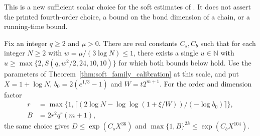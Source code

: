 This is a new sufficient scalar choice for the soft estimates of
\cite[lines 1262--1268 and 1373--1420]{Arad2016RigorousRG}.
It does not assert the printed fourth-order choice, a bound on the bond dimension of a chain, or a running-time bound.

\begin{theorem}
    \label{thm:soft_scalar_growth}
    \leanok
    Fix an integer $q\ge2$ and $\mu>0$. There are real constants $C_s,C_b$
    such that for each integer $N\ge2$ with $w=\mu/(3\log N)\le1$,
    there exists a single $u\in\mathbb N$ with
    $u\ge\max\{2,S(q,w^2/2,24,10,10)\}$ for which both bounds below hold.
    Use the parameters of Theorem~\ref{thm:soft_family_calibration} at this
    scale, and put $X=1+\log N$, $b_0=2(e^{1/3}-1)$ and $W=t2^{m+1}$.
    For the order and dimension factor
    \begin{align}
        r &= \max\{1,\lceil(2\log N-\log\log(1+\xi/W))/(-\log b_0)\rceil\},
        \label{eq:soft_growth_order}\\
        B &= 2r^2 q^r(m+1), \label{eq:soft_growth_factor}
    \end{align}
    the same choice gives $D\le \exp(C_s X^{36})$ and
    $\max\{1,B\}^{2k}\le \exp(C_b X^{104})$.
\end{theorem}
